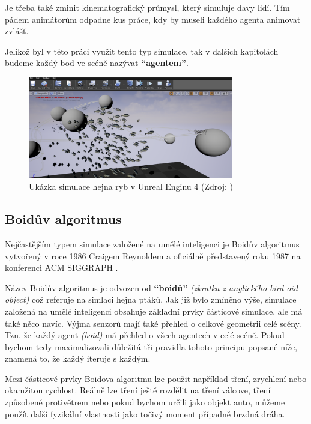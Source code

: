\documentclass[czech,public,dept460,male,cpdeclaration]{diploma}
\begin{document}
Je třeba také zminit kinematografický průmysl, který simuluje davy lidí. Tím pádem animátorům odpadne kus práce, kdy by museli každého agenta animovat zvlášť.

Jelikož byl v této práci využit tento typ simulace, tak v dalších kapitolách budeme každý bod ve scéně nazývat \textbf{``agentem''}.

\begin{figure}\centering\includegraphics[width=0.8\textwidth]{Figures/flock_fish.png}
	\caption{
		Ukázka simulace hejna ryb v Unreal Enginu 4 (Zdroj: \cite{linkToUnrealEngineFish})
	}
\end{figure}

\subsection{Boidův algoritmus}

Nejčastějším typem simulace založené na umělé inteligenci je Boidův algoritmus  vytvořený v roce 1986 Craigem Reynoldem a oficiálně představený roku 1987 na konferenci ACM SIGGRAPH \cite{linkToACM, linkToSIGGRAPH}.

Název Boidův algoritmus je odvozen od \textbf{``boidů''} \textit{(zkratka z anglického bird-oid object)} což referuje na simlaci hejna ptáků. Jak již bylo zmíněno výše, simulace založená na
umělé inteligenci obsahuje základní prvky částicové simulace, ale má také něco navíc. Výjma senzorů mají také přehled o celkové geometrii celé scény. Tzn. že každý agent \textit{(boid)} má přehled o všech agentech v celé scéně. Pokud bychom tedy maximalizovali důležitá tři pravidla tohoto principu popsané níže, znamená to, že každý iteruje s každým.

Mezi částicové prvky Boidova algoritmu lze použit například tření, zrychlení nebo okamžitou rychlost. Reálně lze tření ještě rozdělit na tření válcove, tření způsobené protivětrem nebo pokud bychom určili jako objekt auto, můžeme použít další fyzikální vlastnosti jako točivý moment případně brzdná dráha.
\end{document}

